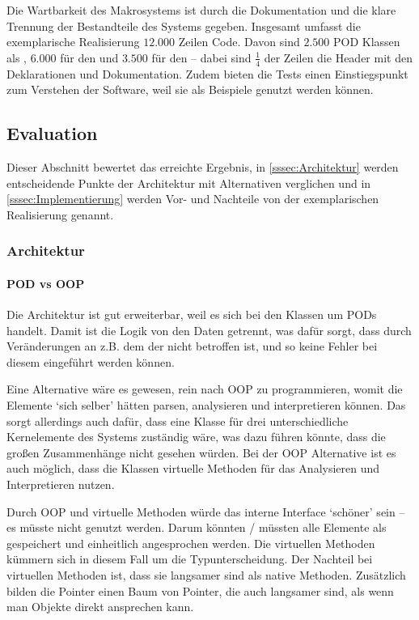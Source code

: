   Die Wartbarkeit des Makrosystems ist durch die Dokumentation und die klare Trennung der Bestandteile des Systems gegeben. Insgesamt umfasst die exemplarische Realisierung $12.000$ Zeilen Code. Davon sind $2.500$ POD Klassen als , $6.000$ für den  und $3.500$ für den  -- dabei sind $\frac{1}{4}$ der Zeilen die Header mit den Deklarationen und Dokumentation. Zudem bieten die Tests einen Einstiegspunkt zum Verstehen der Software, weil sie als Beispiele genutzt werden können.

\subsection{Evaluation}
\label{ssec:Evaluation}
  Dieser Abschnitt bewertet das erreichte Ergebnis, in \autoref{sssec:Architektur} werden entscheidende Punkte der Architektur mit Alternativen verglichen und in \autoref{sssec:Implementierung} werden Vor- und Nachteile von der exemplarischen Realisierung genannt.

  \subsubsection{Architektur}
  \label{sssec:Architektur}
    \paragraph{POD vs OOP}
      Die Architektur ist gut erweiterbar, weil es sich bei den  Klassen um PODs handelt. Damit ist die Logik von den Daten getrennt, was dafür sorgt, dass durch Veränderungen an z.B. dem  der  nicht betroffen ist, und so keine Fehler bei diesem eingeführt werden können.

      Eine Alternative wäre es gewesen, rein nach OOP zu programmieren, womit die  Elemente `sich selber' hätten parsen, analysieren und interpretieren können. Das sorgt allerdings auch dafür, dass eine Klasse für drei unterschiedliche Kernelemente des Systems zuständig wäre, was dazu führen könnte, dass die großen Zusammenhänge nicht gesehen würden. Bei der OOP Alternative ist es auch möglich, dass die Klassen virtuelle Methoden für das Analysieren und Interpretieren nutzen.

      Durch OOP und virtuelle Methoden würde das interne Interface `schöner' sein -- es müsste nicht  genutzt werden. Darum könnten / müssten alle Elemente als  gespeichert und einheitlich angesprochen werden. Die virtuellen Methoden kümmern sich in diesem Fall um die Typunterscheidung. Der Nachteil bei virtuellen Methoden ist, dass sie langsamer sind als native Methoden. Zusätzlich bilden die Pointer einen Baum von Pointer, die auch langsamer sind, als wenn man Objekte direkt ansprechen kann.

